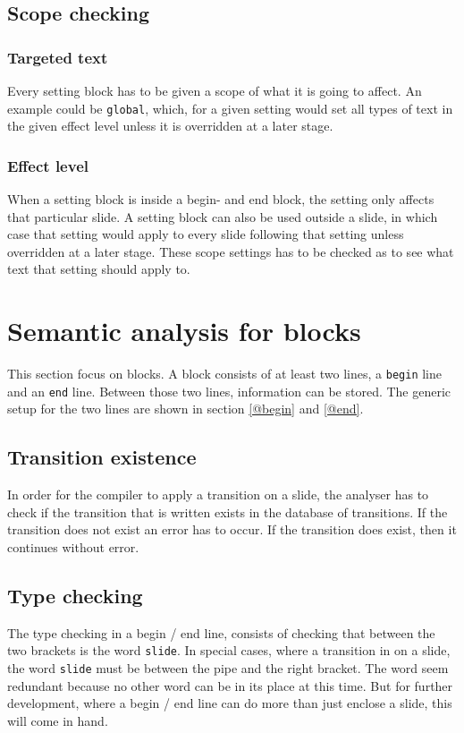      
\subsection{Scope checking}

\subsubsection*{Targeted text}
Every setting block has to be given a scope of what it is going to affect. An example could be \texttt{global}, which, for a given setting would set all types of text in the given effect level unless it is overridden at a later stage.
\subsubsection*{Effect level}
When a setting block is inside a begin- and end block, the setting only affects that particular slide.
A setting block can also be used outside a slide, in which case that setting would apply to every slide following that setting unless overridden at a later stage. These scope settings has to be checked as to see what text that setting should apply to.

\section{Semantic analysis for blocks}
This section focus on blocks. A block consists of at least two lines, a \texttt{begin} line and an \texttt{end} line.
Between those two lines, information can be stored.
The generic setup for the two lines are shown in section \ref{@begin} and \ref{@end}.

    \subsection{Transition existence}
In order for the compiler to apply a transition on a slide, the analyser has to check if the transition that is written exists in the database of transitions. If the transition does not exist an error has to occur. If the transition does exist, then it continues without error.

    \subsection{Type checking}
The type checking in a begin / end line, consists of checking that between the two brackets is the word \texttt{slide}. In special cases, where a transition in on a slide, the word \texttt{slide} must be between the pipe and the right bracket. The word seem redundant because no other word can be in its place at this time. But for further development, where a begin / end line can do more than just enclose a slide, this will come in hand.


